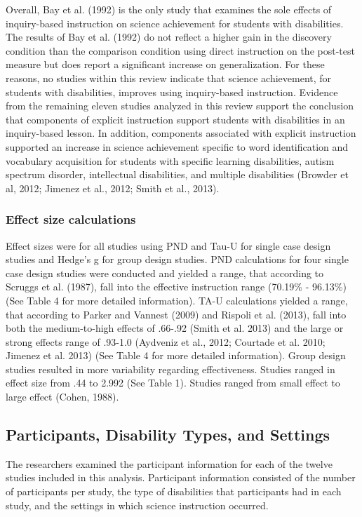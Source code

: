 \documentclass[11.5pt]{sig-alternate} %
\begin{document}
\begin{large}
Overall, Bay et al. (1992) is the only study that examines the sole effects of inquiry-based instruction on science achievement for students with disabilities.  The results of Bay et al. (1992) do not reflect a higher gain in the discovery condition than the comparison condition using direct instruction on the post-test measure but does report a significant increase on generalization.  For these reasons, no studies within this review indicate that science achievement, for students with disabilities, improves using inquiry-based instruction.  Evidence from the remaining eleven studies analyzed in this review support the conclusion that components of explicit instruction support students with disabilities in an inquiry-based lesson.  In addition, components associated with explicit instruction supported an increase in science achievement specific to word identification and vocabulary acquisition for students with specific learning disabilities, autism spectrum disorder, intellectual disabilities, and multiple disabilities (Browder et al, 2012; Jimenez et al., 2012; Smith et al., 2013).

\subsubsection*{Effect size calculations}
Effect sizes were for all studies using PND and Tau-U for single case design studies and Hedge’s g for group design studies.  PND calculations for four single case design studies were conducted and yielded a range, that according to Scruggs et al. (1987), fall into the effective instruction range (70.19\% - 96.13\%) (See Table 4 for more detailed information).  TA-U calculations yielded a range, that according to Parker and Vannest (2009) and Rispoli et al. (2013), fall into both the medium-to-high effects of .66-.92 (Smith et al. 2013) and the large or strong effects range of .93-1.0 (Aydveniz et al., 2012; Courtade et al. 2010; Jimenez et al. 2013) (See Table 4 for more detailed information). Group design studies resulted in more variability regarding effectiveness.  Studies ranged in effect size from .44 to 2.992 (See Table 1).  Studies ranged from small effect to large effect (Cohen, 1988).

\subsection*{Participants, Disability Types, and Settings}

The researchers examined the participant information for each of the twelve studies included in this analysis.  Participant information consisted of the number of participants per study, the type of disabilities that participants had in each study, and the settings in which science instruction occurred.


\end{large}
\end{document}
